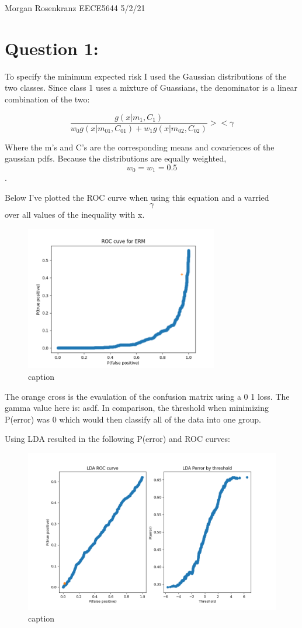 \documentclass[11pt]{article}
\begin{document}
Morgan Rosenkranz 
EECE5644 
5/2/21 

\section*{Question 1:}

To specify the minimum expected risk I used the Gaussian distributions of the two classes.
Since class 1 uses a mixture of Guassians, the denominator is a linear combination of the two: 
 
 \[
\frac{g(x\vert m_1, C_1)}{w_0 g(x\vert m_01, C_01) + w_1 g(x\vert m_02, C_02)} >< \gamma
 \]

Where the m's and C's are the corresponding means and covariences of the gaussian pdfs.
Because the distributions are equally weighted, $$w_0 = w_1 = 0.5$$.

Below I've plotted the ROC curve when using this equation and a varried $$\gamma$$ over all values of the inequality with x.
\begin{figure}[H]
	\centering
	\includegraphics[width=0.75\textwidth]{ermroc}
	\caption{caption}
\end{figure}
The orange cross is the evaulation of the confusion matrix using a 0 1 loss.
The gamma value here is: asdf.
In comparison, the threshold when minimizing P(error) was 0 which would then classify all of the data into one group.

Using LDA resulted in the following P(error) and ROC curves:
\begin{figure}[H]
	\centering
	\includegraphics[width=\textwidth]{ldaroc}
	\caption{caption}
\end{figure}
\end{document}
